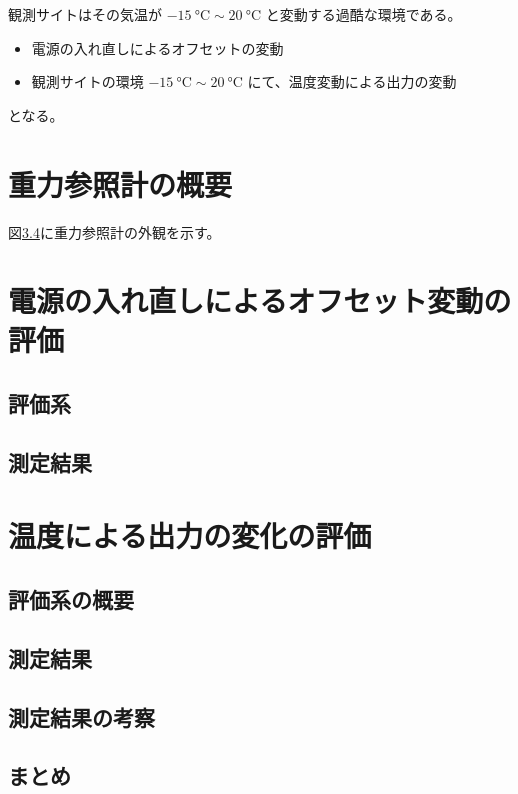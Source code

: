 \documentclass[../../main.tex]{subfiles}
\begin{document}
観測サイトはその気温が $\SI{-15}{\degreeCelsius} \sim \SI{20}{\degreeCelsius}$ と変動する過酷な環境である。
\begin{itemize}
    \item 電源の入れ直しによるオフセットの変動
    \item 観測サイトの環境 $\SI{-15}{\degreeCelsius} \sim \SI{20}{\degreeCelsius}$ にて、温度変動による出力の変動
\end{itemize}
となる。

\section{重力参照計の概要}
図\ref{}に重力参照計の外観を示す。
\section{電源の入れ直しによるオフセット変動の評価}
\subsection{評価系}
\subsection{測定結果}
\section{温度による出力の変化の評価}
\subsection{評価系の概要}
\subsection{測定結果}
\subsection{測定結果の考察}
\subsection{まとめ}
\end{document}
